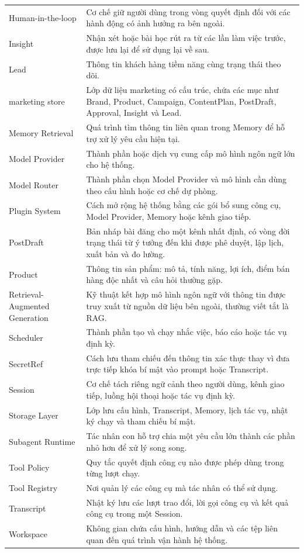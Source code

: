 \documentclass[a4paper]{article}
\begin{document}
\begin{longtable}{L{0.30\textwidth}L{0.60\textwidth}}
Human-in-the-loop & Cơ chế giữ người dùng trong vòng quyết định đối với các hành động có ảnh hưởng ra bên ngoài.\\
Insight & Nhận xét hoặc bài học rút ra từ các lần làm việc trước, được lưu lại để sử dụng lại về sau.\\
Lead & Thông tin khách hàng tiềm năng cùng trạng thái theo dõi.\\
marketing store & Lớp dữ liệu marketing có cấu trúc, chứa các mục như Brand, Product, Campaign, ContentPlan, PostDraft, Approval, Insight và Lead.\\
Memory Retrieval & Quá trình tìm thông tin liên quan trong Memory để hỗ trợ xử lý yêu cầu hiện tại.\\
Model Provider & Thành phần hoặc dịch vụ cung cấp mô hình ngôn ngữ lớn cho hệ thống.\\
Model Router & Thành phần chọn Model Provider và mô hình cần dùng theo cấu hình hoặc cơ chế dự phòng.\\
Plugin System & Cách mở rộng hệ thống bằng các gói bổ sung công cụ, Model Provider, Memory hoặc kênh giao tiếp.\\
PostDraft & Bản nháp bài đăng cho một kênh nhất định, có vòng đời trạng thái từ ý tưởng đến khi được phê duyệt, lập lịch, xuất bản và đo lường.\\
Product & Thông tin sản phẩm: mô tả, tính năng, lợi ích, điểm bán hàng độc nhất và câu hỏi thường gặp.\\
Retrieval-Augmented Generation & Kỹ thuật kết hợp mô hình ngôn ngữ với thông tin được truy xuất từ nguồn dữ liệu bên ngoài, thường viết tắt là RAG.\\
Scheduler & Thành phần tạo và chạy nhắc việc, báo cáo hoặc tác vụ định kỳ.\\
SecretRef & Cách lưu tham chiếu đến thông tin xác thực thay vì đưa trực tiếp khóa bí mật vào prompt hoặc Transcript.\\
Session & Cơ chế tách riêng ngữ cảnh theo người dùng, kênh giao tiếp, luồng hội thoại hoặc tác vụ định kỳ.\\
Storage Layer & Lớp lưu cấu hình, Transcript, Memory, lịch tác vụ, nhật ký chạy và tham chiếu bí mật.\\
Subagent Runtime & Tác nhân con hỗ trợ chia một yêu cầu lớn thành các phần nhỏ hơn để xử lý song song.\\
Tool Policy & Quy tắc quyết định công cụ nào được phép dùng trong từng lượt chạy.\\
Tool Registry & Nơi quản lý các công cụ mà tác nhân có thể sử dụng.\\
Transcript & Nhật ký lưu các lượt trao đổi, lời gọi công cụ và kết quả công cụ trong một Session.\\
Workspace & Không gian chứa cấu hình, hướng dẫn và các tệp liên quan đến quá trình vận hành hệ thống.\\
\bottomrule
\end{longtable}
\endgroup
\end{document}
